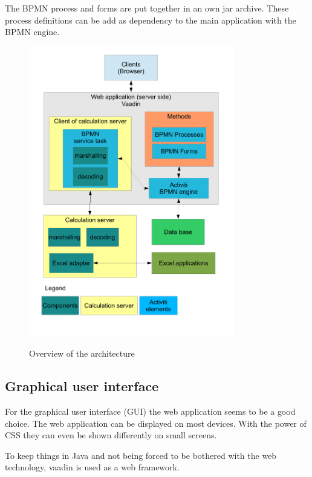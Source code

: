 \documentclass[paper=a4,twoside=false,BCOR=0mm,DIV=calc,fontsize=12pt]{scrartcl}
\begin{document}
The BPMN process and forms are put together in an own jar archive. These process definitions can be add as dependency to the main application with the BPMN engine.


\begin{figure}
    \begin{center}
      \includegraphics[width=0.8\textwidth]{./img/ArchitectrueOverview.pdf}\\
    \end{center}
  \caption{Overview of the architecture}
  \label{architectureoverview}
\end{figure} 

\subsection{Graphical user interface}
For the graphical user interface (GUI) the web application seems to be a good choice. The web application can be displayed on most devices. With the power of CSS \cite{css} they can even be shown differently on small screens.

To keep things in Java and not being forced to be bothered with the web technology, vaadin \cite{vaadin} is used as a web framework.
\end{document}
